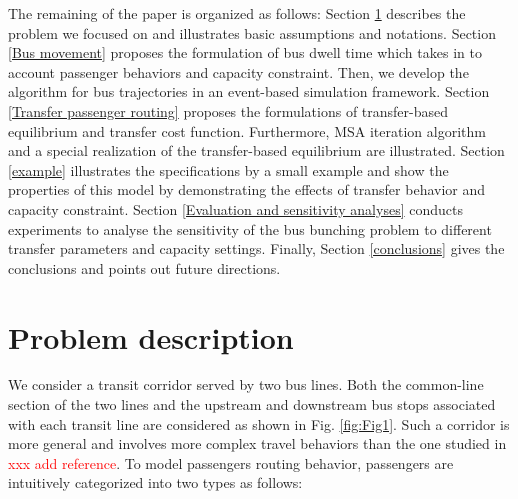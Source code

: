 \documentclass[smallextended]{svjour3}       %
\begin{document}
\begin{Abstract}
The remaining of the paper is organized as follows: 
Section \ref{Problem description} describes the problem we focused on and illustrates basic assumptions and notations. 
Section \ref{Bus movement} proposes the formulation of bus dwell time which takes in to account passenger behaviors and capacity constraint.
Then, we develop the algorithm for bus trajectories in an event-based simulation framework. 
Section \ref{Transfer passenger routing} proposes the formulations of transfer-based equilibrium and transfer cost function.
Furthermore, MSA iteration algorithm and a special realization of the transfer-based equilibrium are illustrated.
Section \ref{example} illustrates the specifications by a small example 
and show the properties of this model 
by demonstrating the effects of transfer behavior and capacity constraint.
Section \ref{Evaluation and sensitivity analyses} conducts experiments to analyse the sensitivity of the bus bunching problem 
to different transfer parameters and capacity settings. 
Finally, Section \ref{conclusions} gives the conclusions and points out future directions.


\section{Problem description}\label{Problem description}
We consider a transit corridor served by two bus lines. Both the common-line section of the two lines and the upstream and downstream bus stops associated with each transit line are considered as shown in Fig. \ref{fig:Fig1}. Such a corridor is more general and involves more complex travel behaviors than the one studied in \textcolor{red}{xxx add reference}. To model passengers routing behavior, passengers are intuitively categorized into two types as follows:


\end{Abstract}
\end{document}
